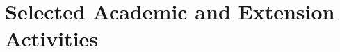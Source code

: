 \documentclass[10pt,a4paper]{article}
\newif\ifES
\newcommand{\tr}[2]{\ifES#2\else#1\fi}
\begin{document}

\section*{\tr{Selected Academic and Extension Activities}{Actividades acad\'{e}micas y de extensi\'{o}n seleccionadas}}
\end{document}
